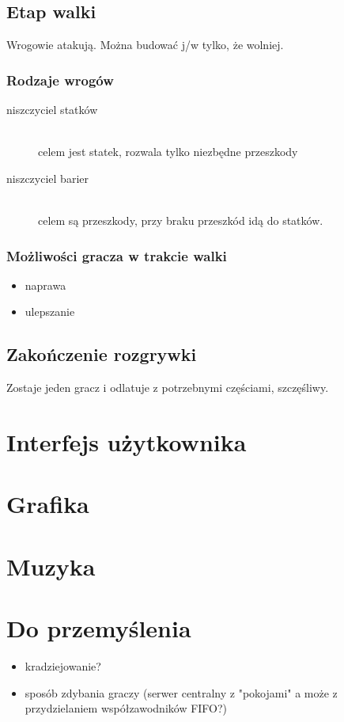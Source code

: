 \documentclass[a4paper,12pt]{report}
\begin{document}
\section{Etap walki}

Wrogowie atakują. Można budować j/w tylko, że wolniej.

\subsection{Rodzaje wrogów}

\begin{description}
\item[niszczyciel statków] \hfill\\ celem jest statek, rozwala tylko niezbędne przeszkody
\item[niszczyciel barier] \hfill\\ celem są przeszkody, przy braku przeszkód idą do statków.
\end{description}

\subsection{Możliwości gracza w trakcie walki}
\begin{itemize}
\item naprawa
\item ulepszanie
\end{itemize}

\section{Zakończenie rozgrywki}

Zostaje jeden gracz i odlatuje z potrzebnymi częściami, szczęśliwy.


\chapter{Interfejs użytkownika}

\chapter{Grafika}

\chapter{Muzyka}

\chapter{Do przemyślenia}

\begin{itemize}
\item kradziejowanie?
\item sposób zdybania graczy (serwer centralny z "pokojami" a może z przydzielaniem współzawodników FIFO?)
\end{itemize}
\end{document}
